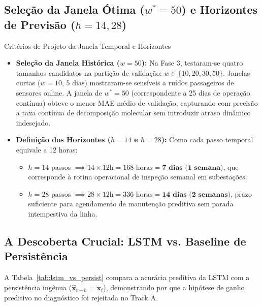 \documentclass[11pt,a4paper]{article}
\begin{document}
\subsection{Seleção da Janela Ótima \texorpdfstring{($w^* = 50$)}{(w* = 50)} e Horizontes de Previsão \texorpdfstring{($h=14, 28$)}{(h=14, 28)}}
\begin{decisionBox}{Critérios de Projeto da Janela Temporal e Horizontes}
\begin{itemize}
  \item \textbf{Seleção da Janela Histórica ($w=50$):} Na Fase 3, testaram-se quatro tamanhos candidatos na partição de validação: $w \in \{10, 20, 30, 50\}$. Janelas curtas ($w=10$, 5 dias) mostraram-se sensíveis a ruídos passageiros de sensores online. A janela de $w^* = 50$ (correspondente a 25 dias de operação contínua) obteve o menor MAE médio de validação, capturando com precisão a taxa contínua de decomposição molecular sem introduzir atraso dinâmico indesejado.
  \item \textbf{Definição dos Horizontes ($h=14$ e $h=28$):} Como cada passo temporal equivale a 12 horas:
  \begin{itemize}
    \item $h = 14$ passos $\implies 14 \times 12\text{h} = 168\text{ horas} = \mathbf{7\text{ dias (1 semana)}}$, que corresponde à rotina operacional de inspeção semanal em subestações.
    \item $h = 28$ passos $\implies 28 \times 12\text{h} = 336\text{ horas} = \mathbf{14\text{ dias (2 semanas)}}$, prazo suficiente para agendamento de manutenção preditiva sem parada intempestiva da linha.
  \end{itemize}
\end{itemize}
\end{decisionBox}

\subsection{A Descoberta Crucial: LSTM vs. Baseline de Persistência}
A Tabela~\ref{tab:lstm_vs_persist} compara a acurácia preditiva da LSTM com a persistência ingênua ($\hat{\mathbf{x}}_{t+h} = \mathbf{x}_t$), demonstrando por que a hipótese de ganho preditivo no diagnóstico foi rejeitada no Track A.
\end{document}
